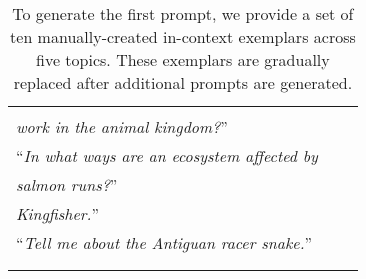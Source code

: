 \begin{table}[th]
\begin{tabular}{l ll}
        \midrule
        \makecell[l]{Animals} & \makecell[l]{``\textit{How does the mimicry defense mechanism}\\\textit{work in the animal kingdom?}''\\``\textit{In what ways are an ecosystem affected by}\\\textit{salmon runs?}''} & \makecell[l]{``\textit{Tell me about the South Philippine Dwarf}\\\textit{Kingfisher.}''\\``\textit{Tell me about the Antiguan racer snake.}''\\\\} \\
        \bottomrule
    \end{tabular}
    \caption{
    To generate the first prompt, we provide a set of ten manually-created in-context exemplars across five topics.
    These exemplars are gradually replaced after additional prompts are generated.
    }
    \label{tab:data-generation-exemplars}
\end{table}